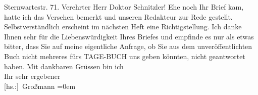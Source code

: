 \begin{ledgroupsized}[t]{13cm}
           \pstart
           \noindent{}\raggedleft{}Sternwartestr. 71.\pend
           \pstart{}Verehrter Herr Doktor Schnitzler!\pend\pstart
           Ehe noch Ihr Brief kam, hatte ich das Versehen bemerkt und unseren Redakteur zur Rede gestellt.
               Selbstverständlich erscheint im nächsten Heft eine Richtigstellung.\pend
           \pstart
           Ich danke Ihnen sehr für die Liebenswürdigkeit Ihres Briefes und empfinde es nur als
               etwas bitter, dass Sie auf meine eigentliche Anfrage, ob Sie aus dem
               unveröffentlichten Buch nicht
               mehreres fürs TAGE-BUCH uns geben könnten, nicht geantwortet haben.\pend
           \pstart
           Mit dankbaren Grüssen bin ich{\\[\baselineskip]}Ihr sehr ergebener{\\[\baselineskip]}\spacefill\mbox{{[}hs.:{]} Großmann}\pend
           \leftskip=0em{}\endnumbering{}\end{ledgroupsized}  \newcommand{\dateiname}{L02477}\newcommand{\titel}{Stefan Großmann an Arthur Schnitzler, 2. 6. 1926}\newcommand{\editorInnen}{ Martin Anton Müller und Gerd-Hermann Susen}
      